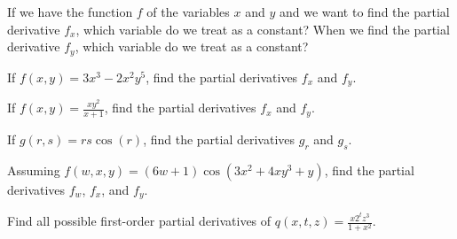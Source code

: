 \begin{activity} \label{A:10.2.2} 
  \ba
\item If we have the function $f$ of the variables $x$ and $y$ and we want to find the partial derivative
  $f_x$, which variable do we treat as a constant?  When we find the
  partial derivative $f_y$, which variable do we treat as a constant?

\item If $f(x,y) = 3x^3 - 2x^2y^5$, find the partial derivatives $f_x$
  and $f_y$.

\item If $f(x,y) = \displaystyle\frac{xy^2}{x+1}$, find the partial
  derivatives $f_x$ and $f_y$.

\item If $g(r,s) = rs\cos(r)$, find the partial derivatives $g_r$ and
  $g_s$. 
		
\item Assuming $f(w,x,y) = (6w+1)\cos(3x^2+4xy^3+y)$, find the partial
  derivatives $f_w$, $f_x$, and $f_y$.
	
\item Find all possible first-order partial derivatives of $q(x,t,z) =
  \displaystyle \frac{x2^tz^3}{1+x^2}.$
	
  \ea

\end{activity}
\begin{smallhint}

\end{smallhint}
\begin{bighint}

\end{bighint}
